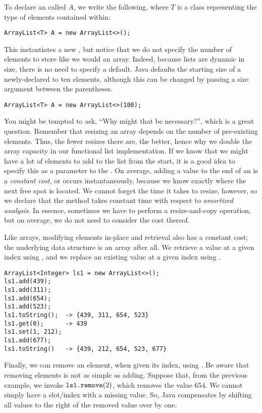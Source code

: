 To declare an  called $A$, we write the following, where $T$ is a class representing the type of elements contained within:
\par{
\begin{verbatim}
ArrayList<T> A = new ArrayList<>();
\end{verbatim}
}
This instantiates a new , but notice that we do not specify the number of elements to store like we would an array. Indeed, because lists are dynamic in size, there is no need to specify a default. Java defaults the starting size of a newly-declared  to ten elements, although this can be changed by passing a size argument between the parentheses.
\par{
\begin{verbatim}
ArrayList<T> A = new ArrayList<>(100);
\end{verbatim}
}
You might be tempted to ask, ``Why might that be necessary?'', which is a great question. Remember that resizing an array depends on the number of pre-existing elements. Thus, the fewer resizes there are, the better, hence why we double the array capacity in our functional list implementation. If we know that we might have a lot of elements to add to the list from the start, it is a good idea to specify this as a parameter to the . On average, adding a value to the end of an  is a \textit{constant cost}, or occurs instantaneously, because we know exactly where the next free spot is located. We cannot forget the time it takes to resize, however, so we declare that the  method takes constant time with respect to \textit{amortized analysis}. In essence, sometimes we have to perform a resize-and-copy operation, but on average, we do not need to consider the cost thereof.

Like arrays, modifying elements in-place and retrieval also has a constant cost; the underlying data structure is an array after all. We retrieve a value at a given index using , and we replace an existing value at a given index using .

\par{
\begin{verbatim}
ArrayList<Integer> ls1 = new ArrayList<>();
ls1.add(439);
ls1.add(311);
ls1.add(654);
ls1.add(523);
ls1.toString();  -> {439, 311, 654, 523}
ls1.get(0);      -> 439
ls1.set(1, 212);
ls1.add(677);
ls1.toString()   -> {439, 212, 654, 523, 677}
\end{verbatim}
}
Finally, we can remove an element, when given its index, using . Be aware that removing elements is not as simple as adding. Suppose that, from the previous example, we invoke $\texttt{ls1.remove}(2)$, which removes the value $654$. We cannot simply have a slot/index with a missing value. So, Java compensates by shifting all values to the right of the removed value over by one.

